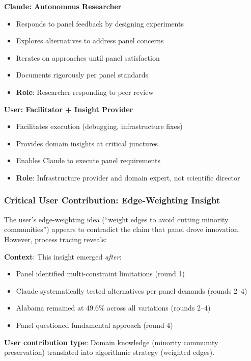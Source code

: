 \textbf{Claude: Autonomous Researcher}
\begin{itemize}[leftmargin=*]
\item Responds to panel feedback by designing experiments
\item Explores alternatives to address panel concerns
\item Iterates on approaches until panel satisfaction
\item Documents rigorously per panel standards
\item \textbf{Role}: Researcher responding to peer review
\end{itemize}

\textbf{User: Facilitator + Insight Provider}
\begin{itemize}[leftmargin=*]
\item Facilitates execution (debugging, infrastructure fixes)
\item Provides domain insights at critical junctures
\item Enables Claude to execute panel requirements
\item \textbf{Role}: Infrastructure provider and domain expert, not scientific director
\end{itemize}

\subsubsection{Critical User Contribution: Edge-Weighting Insight}

The user's edge-weighting idea (``weight edges to avoid cutting minority communities'') appears to contradict the claim that panel drove innovation. However, process tracing reveals:

\textbf{Context}: This insight emerged \emph{after}:
\begin{itemize}[leftmargin=*]
\item Panel identified multi-constraint limitations (round 1)
\item Claude systematically tested alternatives per panel demands (rounds 2--4)
\item Alabama remained at 49.6\% across all variations (rounds 2--4)
\item Panel questioned fundamental approach (round 4)
\end{itemize}

\textbf{User contribution type}: Domain knowledge (minority community preservation) translated into algorithmic strategy (weighted edges).

